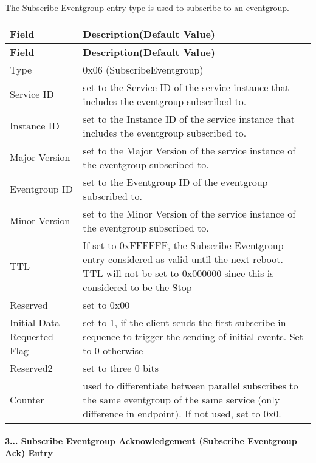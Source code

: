 \begin{DoxyItemize}
\item The Subscribe Eventgroup entry type is used to subscribe to an eventgroup. \tabulinesep=1mm
\begin{longtabu} spread 0pt [c]{*{2}{|X[-1]}|}
\hline
\rowcolor{\tableheadbgcolor}\textbf{ Field }&\textbf{ Description(\+Default Value)  }\\
\endfirsthead
\hline
\endfoot
\hline
\rowcolor{\tableheadbgcolor}\textbf{ Field }&\textbf{ Description(\+Default Value)  }\\
\endhead
Type &0x06 (Subscribe\+Eventgroup) \\
Service ID &set to the Service ID of the service instance that includes the eventgroup subscribed to. \\
Instance ID &set to the Instance ID of the service instance that includes the eventgroup subscribed to. \\
Major Version &set to the Major Version of the service instance of the eventgroup subscribed to. \\
Eventgroup ID &set to the Eventgroup ID of the eventgroup subscribed to. \\
Minor Version &set to the Minor Version of the service instance of the eventgroup subscribed to. \\
T\+TL &If set to 0x\+F\+F\+F\+F\+FF, the Subscribe Eventgroup entry considered as valid until the next reboot. T\+TL will not be set to 0x000000 since this is considered to be the Stop \\
Reserved &set to 0x00 \\
Initial Data Requested Flag &set to 1, if the client sends the first subscribe in sequence to trigger the sending of initial events. Set to 0 otherwise \\
Reserved2 &set to three 0 bits \\
Counter &used to differentiate between parallel subscribes to the same eventgroup of the same service (only difference in endpoint). If not used, set to 0x0. \\
\end{longtabu}

\end{DoxyItemize}

\paragraph*{3... Subscribe Eventgroup Acknowledgement (Subscribe Eventgroup Ack) Entry}


